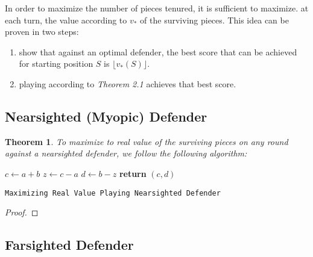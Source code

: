 \documentclass{article}
\theoremstyle{plain}
\newtheorem{thm}{Theorem}[section]
\theoremstyle{definition}
\theoremstyle{remark}
\newcommand{\floor}[1]{\lfloor #1 \rfloor}
\begin{document}
In order to maximize the number of pieces tenured, it is sufficient to maximize. at each turn, the value according to $v_{*}$ of the surviving pieces. This idea can be proven in two steps: 
\begin{enumerate}
  \item show that against an optimal defender, the best score that can be achieved for starting position $S$ is $\floor{v_{*}(S)}$.
  \item playing according to \textit{Theorem 2.1} achieves that best score. 
\end{enumerate}


\subsection{Nearsighted (Myopic) Defender}

\begin{thm}
To maximize to real value of the surviving pieces on any round against a nearsighted defender, we follow the following algorithm:
\end{thm}

\begin{center}
	\begin{minipage}{1\linewidth} %
		\begin{algorithm}[H]
			\medskip
			$c \leftarrow a + b$ \;
			$z \leftarrow c - a$ \;
			$d \leftarrow b - z$ \;
			{\bf return} $(c,d)$ \;
			\caption{\texttt{Maximizing Real Value Playing Nearsighted Defender}} %
			\label{alg:nearsighted}   %
		\end{algorithm}
	\end{minipage}
\end{center}

\begin{proof}

\end{proof}


	

\subsection{Farsighted Defender}
\end{document}
